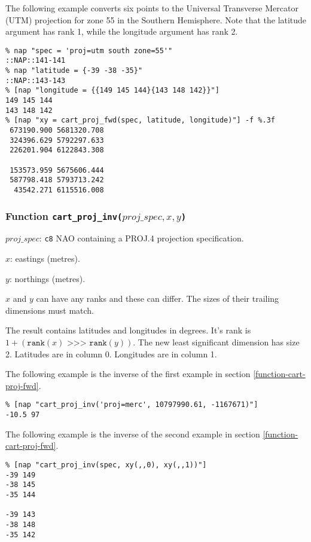 The following example converts 
six points to the Universal Transverse Mercator (UTM) projection for zone 55 in the
Southern Hemisphere.
Note that the latitude argument has rank 1, while the longitude argument has rank 2.
\begin{verbatim}
% nap "spec = 'proj=utm south zone=55'"
::NAP::141-141
% nap "latitude = {-39 -38 -35}"
::NAP::143-143
% [nap "longitude = {{149 145 144}{143 148 142}}"]
149 145 144
143 148 142
% [nap "xy = cart_proj_fwd(spec, latitude, longitude)"] -f %.3f
 673190.900 5681320.708
 324396.629 5792297.633
 226201.904 6122843.308

 153573.959 5675606.444
 587798.418 5793713.242
  43542.271 6115516.008
\end{verbatim}

\subsubsection{Function \texttt{cart\_proj\_inv(}$\mathit{proj\_spec, x, y}$\texttt{)}}
\label{function-cart-proj-inv}

\begin{simpleitems}
    \item $\mathit{proj\_spec}$: \texttt{c8} NAO containing a PROJ.4 projection specification.
    \item $\mathit{x}$: eastings (metres).
    \item $\mathit{y}$: northings (metres).
\end{simpleitems}

$\mathit{x}$ and $\mathit{y}$ can have any ranks and these can differ.
The sizes of their trailing dimensions must match.

The result contains latitudes and longitudes in degrees.
It's rank is
$1 + (\texttt{rank}(\mathit{x}) \texttt{ >>> } \texttt{rank}(\mathit{y}))$.
The new least significant dimension has size 2.
Latitudes are in column 0.  Longitudes are in column 1.

The following example is the inverse of the first example in section 
\ref{function-cart-proj-fwd}.
\begin{verbatim}
% [nap "cart_proj_inv('proj=merc', 10797990.61, -1167671)"]
-10.5 97
\end{verbatim}

The following example is the inverse of the second example in section 
\ref{function-cart-proj-fwd}.
\begin{verbatim}
% [nap "cart_proj_inv(spec, xy(,,0), xy(,,1))"]
-39 149
-38 145
-35 144

-39 143
-38 148
-35 142
\end{verbatim}

